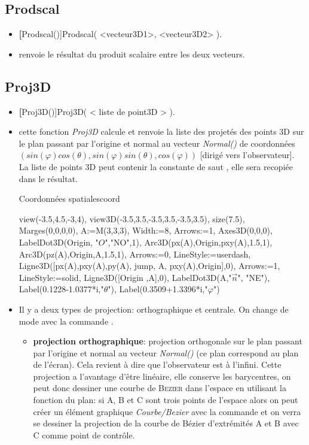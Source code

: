 \subsection{Prodscal}
\begin{itemize}
 \item \util \textbf[Prodscal()]{Prodscal( <vecteur3D1>, <vecteur3D2> )}.
 \item \desc renvoie le résultat du produit scalaire entre les deux vecteurs.
\end{itemize}

\subsection{Proj3D}\label{cmdProj3D}
\begin{itemize}
 \item \util \textbf[Proj3D()]{Proj3D( < liste de point3D > )}.
 \item \desc cette fonction \textsl{Proj3D} calcule et renvoie la liste des projetés des points 3D sur le plan passant par l'origine et normal au vecteur \textsl{Normal()} de coordonnées $(sin(\varphi)cos(\theta), sin(\varphi)sin(\theta),cos(\varphi))$ [dirigé vers l'observateur]. La liste de points 3D peut contenir la constante de saut \jump, elle sera recopiée dans le résultat.

\begin{demo}{Coordonnées spatiales}{coord}
\begin{texgraph}[name=coord]
view(-3.5,4.5,-3,4), view3D(-3.5,3.5,-3.5,3.5,-3.5,3.5), size(7.5), Marges(0,0,0,0),
A:=M(3,3,3), Width:=8, Arrows:=1, Axes3D(0,0,0),
LabelDot3D(Origin, "$O$","NO",1),
Arc3D(px(A),Origin,pxy(A),1.5,1), Arc3D(pz(A),Origin,A,1.5,1),
Arrows:=0, LineStyle:=userdash,
Ligne3D([px(A),pxy(A),py(A), jump, A, pxy(A),Origin],0),
Arrows:=1, LineStyle:=solid, Ligne3D([Origin ,A],0),
LabelDot3D(A,"$\vec{n}$", "NE"),
Label(0.1228-1.0377*i,"$\theta$"),
Label(0.3509+1.3396*i,"$\varphi$")
\end{texgraph}
\end{demo}
 \item Il y a deux types de projection: orthographique et centrale. On change de mode avec la commande .
  \begin{itemize}
   \item \textbf{projection orthographique}: projection orthogonale sur le plan passant par l'origine et normal au vecteur \textsl{Normal()} (ce plan correspond au plan de l'écran). Cela revient à dire que l'observateur est à l'infini. Cette projection a l'avantage d'être linéaire, elle conserve les barycentres, on peut donc dessiner une courbe de \textsc{Bezier} dans l'espace en utilisant la fonction  du plan: si A, B et C sont trois points de l'espace alors on peut créer un élément graphique \textsl{Courbe/Bezier} avec la commande  et on verra se dessiner la projection de la courbe de Bézier d'extrémités A et B avec C comme point de contrôle.


\end{itemize}
\end{itemize}
